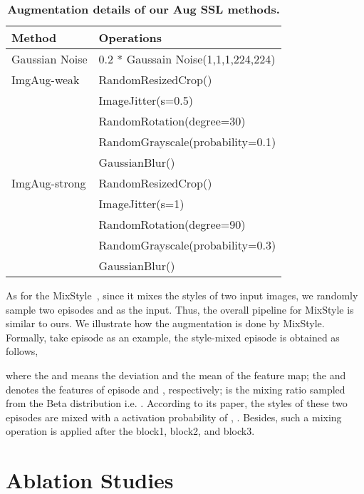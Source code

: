 \documentclass{article}
\begin{document}
\begin{table}[h] 
\begin{center}
\begin{tabular}{ll}
\toprule
\textbf{Method} & \textbf{Operations}  \\ \hline
Gaussian Noise               
& 0.2 * Gaussain Noise(1,1,1,224,224)  \\ \hline

ImgAug-weak                
& RandomResizedCrop()                 \\
\multirow{4}{*}{}            
& ImageJitter(s=0.5)                  \\
& RandomRotation(degree=30)           \\
& RandomGrayscale(probability=0.1)    \\
& GaussianBlur()    \\ 
\hline

ImgAug-strong                
& RandomResizedCrop()                 \\
\multirow{4}{*}{}            
& ImageJitter(s=1)                  \\
& RandomRotation(degree=90)           \\
& RandomGrayscale(probability=0.3)    \\
& GaussianBlur()    \\ 
\bottomrule           
\end{tabular}
\end{center}
\caption{\textbf{Augmentation details of our Aug  SSL methods.}}
\label{aug}
\end{table}


As for the MixStyle~\cite{zhou2021domain}, since it mixes the styles of two input images, we randomly sample two episodes  and  as the input. Thus, the overall pipeline for MixStyle is similar to ours. We illustrate how the augmentation is done by MixStyle. Formally, take episode  as an example, the style-mixed episode  is obtained as follows,
	
	
	
	where the  and  means the deviation and the mean of the feature map; the  and  denotes the features of episode  and , respectively;  is the mixing ratio sampled from the Beta distribution i.e. . 
	According to its paper, the styles of these two episodes are mixed with a activation probability of , . Besides, such a mixing operation is applied after the block1, block2, and block3. 

	


\section{Ablation Studies}
\end{document}
